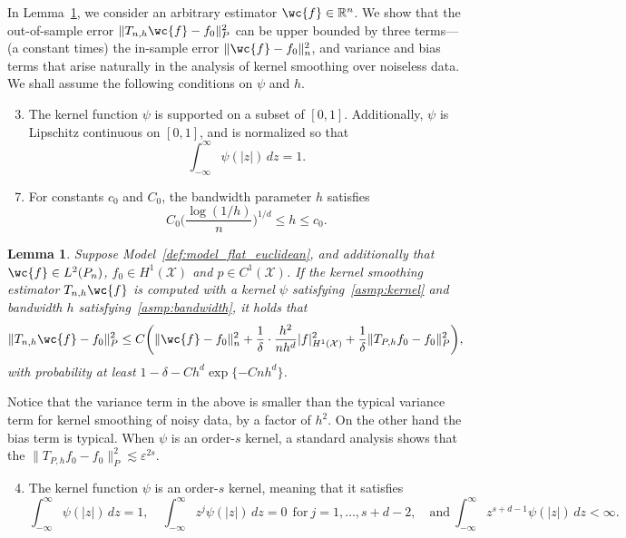 \documentclass{article}
\newcommand{\Reals}{\mathbb{R}}
\newcommand{\1}{\mathbf{1}}
\newcommand{\mc}[1]{\mathcal{#1}}
\theoremstyle{alden}
\theoremstyle{aldenthm}
\newtheorem{lemma}{Lemma}
\theoremstyle{definition}
\theoremstyle{remark}
\begin{document}
In Lemma~\ref{lem:kernel_smoothing_insample}, we consider an arbitrary estimator $\wc{f} \in \Reals^n$. We show that the out-of-sample error $\|T_{n,h}\wc{f} - f_0\|_P^2$ can be upper bounded by three terms--- (a constant times) the in-sample error $\|\wc{f} - f_0\|_n^2$, and variance and bias terms that arise naturally in the analysis of kernel smoothing over noiseless data. We shall assume the following conditions on $\psi$ and $h$.
\begin{enumerate}[label=(K\arabic*)]
	\setcounter{enumi}{2}
	\item
	\label{asmp:kernel}
	The kernel function $\psi$ is supported on a subset of $[0,1]$. Additionally, $\psi$ is Lipschitz continuous on $[0,1]$, and is normalized so that
	\begin{equation*}
	\int_{-\infty}^{\infty} \psi(|z|) \,dz = 1.
	\end{equation*}
\end{enumerate}
\begin{enumerate}[label=(P\arabic*)]
	\setcounter{enumi}{6}
	\item
	\label{asmp:bandwidth}
	For constants $c_0$ and $C_0$, the bandwidth parameter $h$ satisfies
	\begin{equation*}
	C_0\biggl(\frac{\log(1/h)}{n}\biggr)^{1/d} \leq h \leq c_0.
	\end{equation*}
\end{enumerate}
\begin{lemma}
	\label{lem:kernel_smoothing_insample}
	Suppose Model~\ref{def:model_flat_euclidean}, and additionally that $\wc{f} \in L^2(P_n)$, $f_0 \in H^1(\mc{X})$ and $p \in C^1(\mc{X})$. If the kernel smoothing estimator $T_{n,h}\wc{f}$ is computed with a kernel $\psi$ satisfying~\ref{asmp:kernel} and bandwidth $h$ satisfying~\ref{asmp:bandwidth}, it holds that
	\begin{equation}
	\label{eqn:kernel_smoothing_insample}
	\|T_{n,h}\wc{f} - f_0\|_P^2 \leq C\biggl(\|\wc{f} - f_0\|_n^2 + \frac{1}{\delta} \cdot \frac{h^2}{nh^d} |f|_{H^1(\mc{X})}^2 + \frac{1}{\delta}\|T_{P,h}f_0 - f_0\|_P^2\biggr),
	\end{equation}
	with probability at least $1 - \delta - Ch^d\exp\{-Cnh^d\}$. 
\end{lemma}
Notice that the variance term in the above is smaller than the typical variance term for kernel smoothing of noisy data, by a factor of $h^2$. On the other hand the bias term is typical. When $\psi$ is an order-$s$ kernel, a standard analysis shows that the $\|T_{P,h}f_0 - f_0\|_P^2 \lesssim \varepsilon^{2s}$.
\begin{enumerate}[label=(K\arabic*)]
	\setcounter{enumi}{3}
	\item
	\label{asmp:ho_kernel}
	The kernel function $\psi$ is an order-$s$ kernel, meaning that it satisfies
	\begin{equation*}
	\int_{-\infty}^{\infty} \psi(|z|) \,dz = 1, \quad \int_{-\infty}^{\infty} z^j \psi(|z|) \,dz = 0 ~~\textrm{for}~j = 1,\ldots, s + d - 2, \quad \textrm{and}~ \int_{-\infty}^{\infty} z^{s + d - 1} \psi(|z|) \,dz < \infty. 
	\end{equation*}
\end{enumerate}
\end{document}
